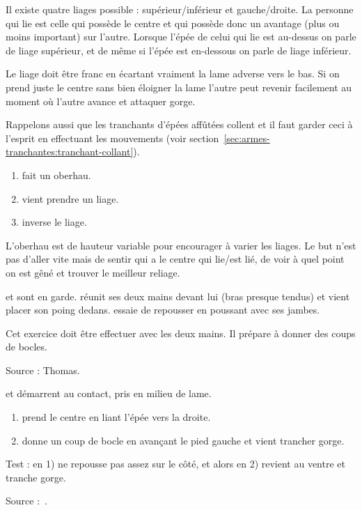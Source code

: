 
Il existe quatre liages possible : supérieur/inférieur et gauche/droite.
La personne qui lie est celle qui possède le centre et qui possède donc un avantage (plus ou moins important) sur l'autre.
Lorsque l'épée de celui qui lie est au-dessus on parle de liage supérieur, et de même si l'épée est en-dessous on parle de liage inférieur.

Le liage doit être franc en écartant vraiment la lame adverse vers le bas. Si on prend juste le centre sans bien éloigner la lame l'autre peut revenir facilement au moment où l'autre avance et attaquer gorge.

Rappelons aussi que les tranchants d'épées affûtées collent et il faut garder ceci à l'esprit en effectuant les mouvements (voir section~\ref{sec:armes-tranchantes:tranchant-collant}).


\begin{exercice}[Liages]

\begin{enumerate}
	\item \A fait un oberhau.
	\item \D vient prendre un liage.
	\item \A inverse le liage.
\end{enumerate}

L'oberhau est de hauteur variable pour encourager \D à varier les liages.
Le but n'est pas d'aller vite mais de sentir qui a le centre qui lie/est lié, de voir à quel point on est gêné et trouver le meilleur reliage.

\end{exercice}


\begin{exercice}
\A et \D sont en garde.
\D réunit ses deux mains devant lui (bras presque tendus) et \A vient placer son poing dedans.
\A essaie de repousser \D en poussant avec ses jambes.

Cet exercice doit être effectuer avec les deux mains.
Il prépare à donner des coups de bocles.

Source : Thomas.

\end{exercice}



\begin{technique}

\A et \D démarrent au contact, pris en milieu de lame.

\begin{enumerate}
	\item \A prend le centre en liant l'épée vers la droite.
	\item \A donne un coup de bocle en avançant le pied gauche et vient trancher gorge.
\end{enumerate}

Test : en 1) \A ne repousse pas assez sur le côté, et alors en 2) \D revient au ventre et tranche gorge.

Source :~\cite{fuhrmann:dijon:I33_liage:2015}.

\end{technique}


